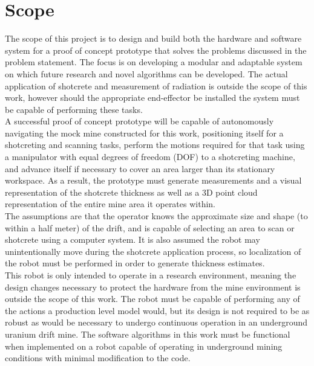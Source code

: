 \section{Scope}
\label{sec:scope}

The scope of this project is to design and build both the hardware and software system for a proof of concept prototype that solves the problems discussed in the problem statement. The focus is on developing a modular and adaptable system on which future research and novel algorithms can be developed. The actual application of shotcrete and measurement of radiation is outside the scope of this work, however should the appropriate end-effector be installed the system must be capable of performing these tasks.\\

A successful proof of concept prototype will be capable of autonomously navigating the mock mine constructed for this work, positioning itself for a shotcreting and scanning tasks, perform the motions required for that task using a manipulator with equal degrees of freedom (DOF) to a shotcreting machine, and advance itself if necessary to cover an area larger than its stationary workspace. As a result, the prototype must generate measurements and a visual representation of the shotcrete thickness as well as a 3D point cloud representation of the entire mine area it operates within.\\

The assumptions are that the operator knows the approximate size and shape (to within a half meter) of the drift, and is capable of selecting an area to scan or shotcrete using a computer system. It is also assumed the robot may unintentionally move during the shotcrete application process, so localization of the robot must be performed in order to generate thickness estimates.\\

This robot is only intended to operate in a research environment, meaning the design changes necessary to protect the hardware from the mine environment is outside the scope of this work. The robot must be capable of performing any of the actions a production level model would, but its design is not required to be as robust as would be necessary to undergo continuous operation in an underground uranium drift mine. The software algorithms in this work must be functional when implemented on a robot capable of operating in underground mining conditions with minimal modification to the code.\\

